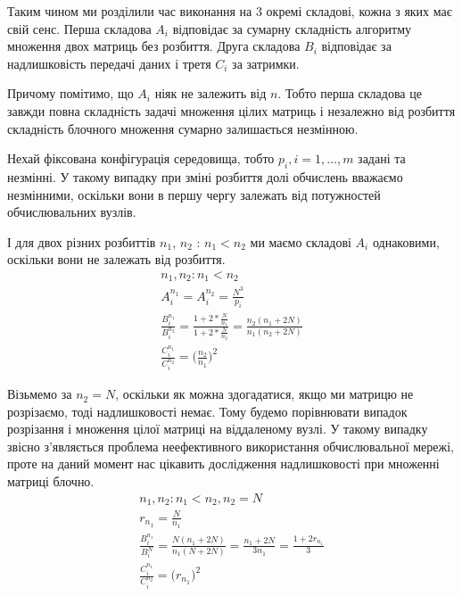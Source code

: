 Таким чином ми розділили час виконання на 3 окремі складові, кожна з яких має свій сенс. Перша складова $A_i$ відповідає за сумарну складність алгоритму множення двох матриць без розбиття. Друга складова $B_i$ відповідає за надлишковість передачі даних і третя $C_i$ за затримки.

Причому помітимо, що $A_i$ ніяк не залежить від $n$. Тобто перша складова це завжди повна складність задачі множення цілих матриць і незалежно від розбиття складність блочного множення сумарно залишається незмінною.

Нехай фіксована конфігурація середовища, тобто $p_i, i=1,\ldots,m$ задані та незмінні. У такому випадку при зміні розбиття долі обчислень вважаємо незмінними, оскільки вони в першу чергу залежать від потужностей обчислювальних вузлів.

І для двох різних розбиттів $n_1$, $n_2$ : $n_1 < n_2$ ми маємо складові $A_i$ однаковими, оскільки вони не залежать від розбиття.
\begin{equation}
	\label{eq:diff_n1n2}
	\begin{gathered}
		n_1, n_2 : n_1 < n_2
		\\
		A_i^{n_1} = A_i^{n_2} = \frac{N^3}{p_i}
		\\
		\frac{B_i^{n_1}}{B_i^{n_2}} = \frac{1 + 2*\frac{N}{n_1}}{1 + 2*\frac{N}{n_2}} =\frac{ n_2 ( n_1 + 2N ) }{n_1 ( n_2 + 2N )}
		\\
		\frac{C_i^{n_1}}{C_i^{n_2}} = \bigg( \frac{n_2}{n_1} \bigg)^2
	\end{gathered}
\end{equation}

Візьмемо за $n_2=N$, оскільки як можна здогадатися, якщо ми матрицю не розрізаємо, тоді надлишковості немає. Тому будемо порівнювати випадок розрізання і множення цілої матриці на віддаленому вузлі. У такому випадку звісно з'являється проблема неефективного використання обчислювальної мережі, проте на даний момент нас цікавить дослідження надлишковості при множенні матриці блочно.
\begin{equation}
\label{eq:diff_n1n22}
	\begin{gathered}
	n_1, n_2 : n_1 < n_2, n_2 = N
	\\
	r_{n_1} = \frac{N}{n_{1}}
	\\
	\frac{B_i^{n_1}}{B_i^{N}} =\frac{ N ( n_1 + 2N ) }{n_1 ( N + 2N )} = \frac{n_1 + 2N}{3n_1} = \frac{1 + 2r_{n_1}}{3}
	\\
	\frac{C_i^{n_1}}{C_i^{n_2}} = \bigg( r_{n_1} \bigg)^2
	\end{gathered}
\end{equation}

